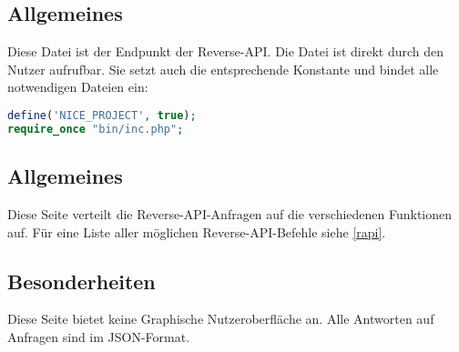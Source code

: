 \subsection{Allgemeines} Diese Datei ist der Endpunkt der Reverse-API.
Die Datei ist direkt durch den Nutzer aufrufbar. Sie setzt auch die entsprechende Konstante und bindet alle notwendigen Dateien ein:
\begin{lstlisting}[language=php]
define('NICE_PROJECT', true);
require_once "bin/inc.php";
\end{lstlisting}
\subsection{Allgemeines}
Diese Seite verteilt die Reverse-API-Anfragen auf die verschiedenen Funktionen auf. Für eine Liste aller möglichen Reverse-API-Befehle siehe \autoref{rapi}.
\subsection{Besonderheiten}
Diese Seite bietet keine Graphische Nutzeroberfläche an. Alle Antworten auf Anfragen sind im JSON-Format.
